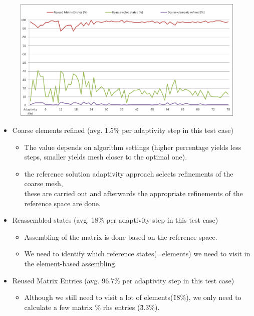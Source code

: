 \documentclass{beamer}
\begin{document}
\begin{frame}
\begin{center}
	\begin{figure}[h!]
			\centering
			\includegraphics[width=.55\textwidth]{graf-technicky.png}
	\end{figure}
\end{center}

\vspace{-6mm} 
\begin{itemize}
\item Coarse elements refined (avg. 1.5\% per adaptivity step in this test case)
\begin{itemize}
\item \vspace{-2.5mm} The value depends on algorithm settings (higher percentage yields less steps, smaller yields mesh closer to the optimal one).
\item \vspace{-2.5mm} the reference solution adaptivity approach selects refinements of the coarse mesh,\\
\vspace{-2.5mm} these are carried out and afterwards the appropriate refinements of the reference space are done.
\end{itemize}
\item \vspace{-2mm} Reassembled states (avg. 18\% per adaptivity step in this test case)
\begin{itemize}
\item \vspace{-2.5mm} Assembling of the matrix is done based on the reference space.
\item \vspace{-2.5mm} We need to identify which reference states(=elements) we need to visit in the element-based assembling.
\end{itemize}
\item \vspace{-2mm} Reused Matrix Entries (avg. 96.7\% per adaptivity step in this test case)
\begin{itemize}
\item \vspace{-2.5mm} {\small Although we still need to visit a lot of elements(\~18\%), we only need to calculate a few matrix \% rhs entries (\~3.3\%).}
\end{itemize}


\end{itemize}
\end{frame}
\end{document}

